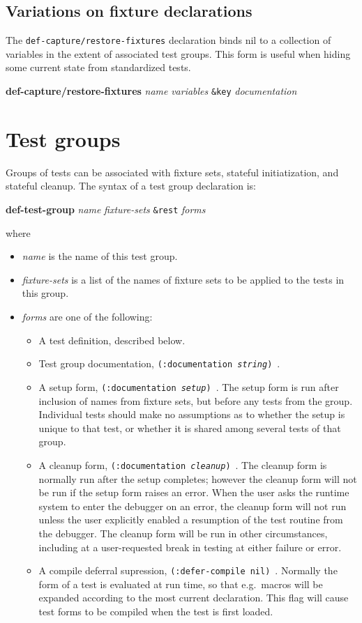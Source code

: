 \documentclass{article}
\begin{document}
\subsection*{Variations on fixture declarations}

The \texttt{def-capture/restore-fixtures} declaration binds nil to a
collection of variables in the extent of associated test groups.  This
form is useful when hiding some current state from standardized tests.
\begin{center}
\textbf{def-capture/restore-fixtures}
 \textit{name} \textit{variables}
\texttt{\&key} \textit{documentation}
\end{center}

\section{Test groups}
Groups of tests can be associated with fixture sets, stateful
initiatization, and stateful cleanup.  The syntax of a test group
declaration is:
\begin{center}
\textbf{def-test-group} \textit{name}
 \textit{fixture-sets} \texttt{\&rest} \textit{forms}
\end{center}
where
\begin{itemize}
\item\textit{name} is the name of this test group.
\item\textit{fixture-sets} is a list of the names of fixture
sets to be applied to the tests in this group.
\item\textit{forms} are one of the following:
\begin{itemize}
\item A test definition, described below.
\item Test group documentation, \texttt{(:documentation
    \textit{string})}~.
\item A setup form, \texttt{(:documentation \textit{setup})}~.  The
  setup form is run after inclusion of names from fixture sets, but
  before any tests from the group.  Individual tests should make no
  assumptions as to whether the setup is unique to that test, or
  whether it is shared among several tests of that group.
\item A cleanup form, \texttt{(:documentation \textit{cleanup})}~.
  The cleanup form is normally run after the setup completes; however
  the cleanup form will not be run if the setup form raises an error.
  When the user asks the runtime system to enter the debugger on an
  error, the cleanup form will not run unless the user explicitly
  enabled a resumption of the test routine from the debugger.  The
  cleanup form will be run in other circumstances, including at a
  user-requested break in testing at either failure or error.
\item A compile deferral supression, \texttt{(:defer-compile nil)}~.
  Normally the form of a test is evaluated at run time, so that e.g.\
  macros will be expanded according to the most current declaration.
  This flag will cause test forms to be compiled when the test is
  first loaded.
\end{itemize}
\end{itemize}
\end{document}
